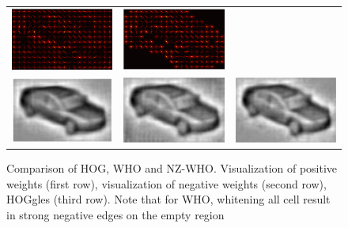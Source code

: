 \documentclass[10pt,twocolumn,letterpaper]{article}
\begin{document}
\begin{figure}[t]
\begin{center}
\begin{tabular}{ccc}
     \includegraphics[width=0.28\linewidth]{whiten_all_neg_crop}  &
     \includegraphics[width=0.28\linewidth]{whiten_non_zero_neg} \\
     \includegraphics[width=0.28\linewidth]{ihog_hog200_crop.png} &
     \includegraphics[width=0.28\linewidth]{ihog_whiten_all200_crop.png} &
     \includegraphics[width=0.28\linewidth]{ihog_whiten_non_zero200_crop.png} \\
 \end{tabular}
  \end{center}
  \caption{Comparison of HOG, WHO and NZ-WHO. Visualization of positive weights (first row),  visualization of negative weights (second row), HOGgles \cite{vondrick2013} (third row). Note that for WHO, whitening all cell result in strong negative edges on the empty region}
  \label{fig:whocomparison}
\end{figure}

\end{document}
